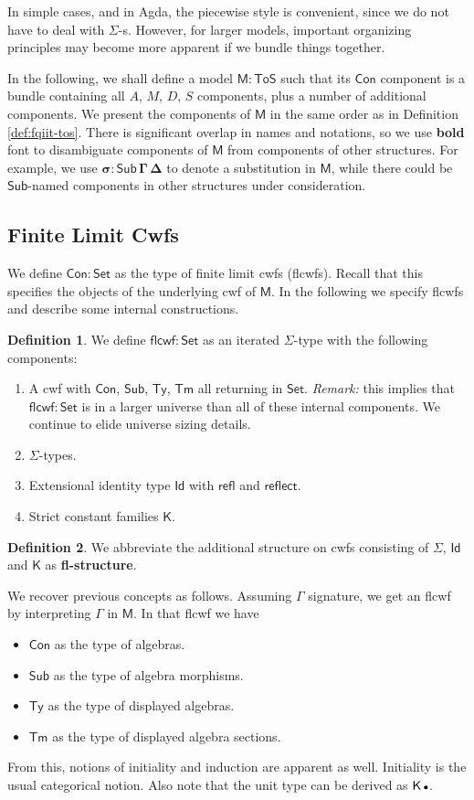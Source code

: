 \documentclass[12pt,a4paper,twoside,openany]{book}
\theoremstyle{remark}
\theoremstyle{definition}
\newtheorem{mydefinition}{Definition}
\theoremstyle{theorem}
\newcommand{\bs}[1]{\boldsymbol{#1}}
\newcommand{\refl}{\mathsf{refl}}
\newcommand{\reflect}{\mathsf{reflect}}
\newcommand{\Con}{\mathsf{Con}}
\newcommand{\Sub}{\mathsf{Sub}}
\newcommand{\Tm}{\mathsf{Tm}}
\newcommand{\Ty}{\mathsf{Ty}}
\newcommand{\Id}{\mathsf{Id}}
\newcommand{\Set}{\mathsf{Set}}
\newcommand{\ToS}{\mathsf{ToS}}
\newcommand{\emptycon}{\scaleobj{.75}\bullet}
\newcommand{\flcwf}{\mathsf{flcwf}}
\newcommand{\K}{\mathsf{K}}
\newcommand{\bCon}{\bs{\Con}}
\newcommand{\bM}{\bs{\mathsf{M}}}
\begin{document}
In simple cases, and in Agda, the piecewise style is convenient, since we do not
have to deal with $\Sigma$-s. However, for larger models, important organizing
principles may become more apparent if we bundle things together.

In the following, we shall define a model $\bM : \ToS$ such that its $\Con$
component is a bundle containing all $A$, $M$, $D$, $S$ components, plus a
number of additional components. We present the components of $\bM$ in the same
order as in Definition \ref{def:fqiit-tos}. There is significant overlap in
names and notations, so we use \textbf{bold} font to disambiguate components of
$\bM$ from components of other structures. For example, we use $\bs{\sigma :
  \Sub\,\Gamma\,\Delta}$ to denote a substitution in $\bM$, while there could be
$\Sub$-named components in other structures under consideration.

\subsection{Finite Limit Cwfs}

We define $\bCon : \Set$ as the type of finite limit cwfs (flcwfs). Recall that this
specifies the objects of the underlying cwf of $\bM$. In the following we
specify flcwfs and describe some internal constructions.

\begin{mydefinition}\label{def:flcwf}
We define $\flcwf : \Set$ as an iterated $\Sigma$-type with the following components:
\begin{enumerate}
  \item A cwf with $\Con$, $\Sub$, $\Ty$, $\Tm$ all returning in $\Set$. \emph{Remark:}
        this implies that $\flcwf : \Set$ is in a larger universe than all of these
        internal components. We continue to elide universe sizing details.
  \item $\Sigma$-types.
  \item Extensional identity type $\Id$ with $\refl$ and $\reflect$.
  \item Strict constant families $\K$.
\end{enumerate}
\end{mydefinition}
\begin{mydefinition}
We abbreviate the additional structure on cwfs consisting of $\Sigma$, $\Id$ and
$\K$ as \textbf{fl-structure}.
\end{mydefinition}

We recover previous concepts as follows. Assuming $\Gamma$ signature, we get an
flcwf by interpreting $\Gamma$ in $\bM$. In that flcwf we have
\begin{itemize}
  \item $\Con$ as the type of algebras.
  \item $\Sub$ as the type of algebra morphisms.
  \item $\Ty$ as the type of displayed algebras.
  \item $\Tm$ as the type of displayed algebra sections.
\end{itemize}
From this, notions of initiality and induction are apparent as well. Initiality
is the usual categorical notion. Also note that the unit type can be derived as
$\K\,\emptycon$.
\end{document}

